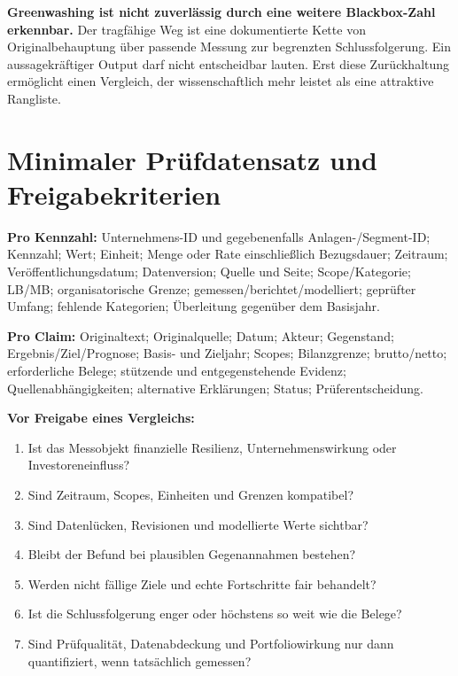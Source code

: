 \documentclass[11pt,a4paper]{article}
\begin{document}
\textbf{Greenwashing ist nicht zuverlässig durch eine weitere Blackbox-Zahl erkennbar.} Der tragfähige Weg ist eine dokumentierte Kette von Originalbehauptung über passende Messung zur begrenzten Schlussfolgerung. Ein aussagekräftiger Output darf \glqq nicht entscheidbar\grqq{} lauten. Erst diese Zurückhaltung ermöglicht einen Vergleich, der wissenschaftlich mehr leistet als eine attraktive Rangliste.

\appendix
\section{Minimaler Prüfdatensatz und Freigabekriterien}
\label{app:schema}
\textbf{Pro Kennzahl:} Unternehmens-ID und gegebenenfalls Anlagen-/Segment-ID; Kennzahl; Wert; Einheit; Menge oder Rate einschließlich Bezugsdauer; Zeitraum; Veröffentlichungsdatum; Datenversion; Quelle und Seite; Scope/Kategorie; LB/MB; organisatorische Grenze; gemessen/berichtet/modelliert; geprüfter Umfang; fehlende Kategorien; Überleitung gegenüber dem Basisjahr.

\textbf{Pro Claim:} Originaltext; Originalquelle; Datum; Akteur; Gegenstand; Ergebnis/Ziel/Prognose; Basis- und Zieljahr; Scopes; Bilanzgrenze; brutto/netto; erforderliche Belege; stützende und entgegenstehende Evidenz; Quellenabhängigkeiten; alternative Erklärungen; Status; Prüferentscheidung.

\textbf{Vor Freigabe eines Vergleichs:}
\begin{enumerate}
\item Ist das Messobjekt finanzielle Resilienz, Unternehmenswirkung oder Investoreneinfluss?
\item Sind Zeitraum, Scopes, Einheiten und Grenzen kompatibel?
\item Sind Datenlücken, Revisionen und modellierte Werte sichtbar?
\item Bleibt der Befund bei plausiblen Gegenannahmen bestehen?
\item Werden nicht fällige Ziele und echte Fortschritte fair behandelt?
\item Ist die Schlussfolgerung enger oder höchstens so weit wie die Belege?
\item Sind Prüfqualität, Datenabdeckung und Portfoliowirkung nur dann quantifiziert, wenn tatsächlich gemessen?
\end{enumerate}
\end{document}
